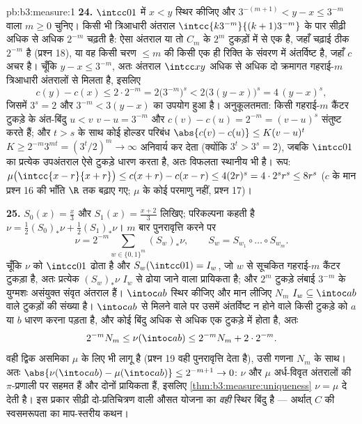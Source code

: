 \begin{solution}{pb:b3:measure:1}
\textbf{24.} $\intcc01$ में $x < y$ स्थिर कीजिए और $3^{-(m+1)} < y - x \leq 3^{-m}$ वाला $m \geq 0$ चुनिए।
किसी भी त्रिआधारी अंतराल $\intcc{k3^{-m}}{(k+1)3^{-m}}$ के पार सीढ़ी अधिक से अधिक $2^{-m}$
चढ़ती है: ऐसा अंतराल या तो $C_m$ के $2^m$ टुकड़ों में से एक है, जहाँ
चढ़ाई ठीक $2^{-m}$ है (प्रश्न 18), या वह किसी चरण $\leq m$ की किसी एक ही
रिक्ति के संवरण में अंतर्विष्ट है, जहाँ $c$ अचर है। चूँकि $y - x \leq
3^{-m}$,
अतः अंतराल $\intcc xy$ अधिक से अधिक दो क्रमागत गहराई-$m$ त्रिआधारी
अंतरालों से मिलता है, इसलिए
\[
c(y) - c(x) \leq 2\cdot2^{-m}
= 2\bigl(3^{-m}\bigr)^{s}
< 2\bigl(3(y - x)\bigr)^{s}
= 4\,(y - x)^{s},
\]
जिसमें $3^{s} = 2$ और $3^{-m} < 3(y - x)$ का उपयोग हुआ है। अनुकूलतमता: किसी गहराई-$m$
कैंटर टुकड़े के अंत-बिंदु $u < v$ $v - u =
3^{-m}$ और $c(v) - c(u) = 2^{-m} = (v - u)^{s}$ संतुष्ट करते हैं; और
$t > s$ के साथ कोई होल्डर परिबंध $\abs{c(v) - c(u)} \leq K(v - u)^{t}$ $K \geq 2^{-m}3^{mt} = (3^{t}/2)^{m} \to \infty$ अनिवार्य कर देता (क्योंकि
$3^{t} > 3^{s} = 2$), जबकि $\intcc01$ का प्रत्येक उपअंतराल ऐसे टुकड़े धारण करता है, अतः
विफलता स्थानीय भी है।  रूप: $\mu\bigl(\intcc{x-r}{x+r}\bigr) \leq
c(x + r) - c(x - r) \leq 4(2r)^{s} = 4\cdot2^{s}r^{s} \leq
8r^{s}$ ($c$ के मान प्रश्न 16 की
भाँति $\R$ तक बढ़ाए गए; $\mu$ के कोई परमाणु नहीं, प्रश्न 17)।

\textbf{25.} $S_0(x) = \frac x3$ और $S_1(x) =
\frac{x+2}3$ लिखिए; परिकल्पना कहती है $\nu = \frac12(S_0)_*\nu +
\frac12(S_1)_*\nu$। $m$
बार पुनरावृत्ति करने पर
\[
\nu = 2^{-m}\sum_{w \in \{0,1\}^m}(S_w)_*\nu,
\qquad S_w = S_{w_1}\circ\dots\circ S_{w_m}.
\]
चूँकि $\nu$ को $\intcc01$ ढोता है और $S_w(\intcc01) =
I_w$, जो $w$ से सूचकित गहराई-$m$
कैंटर टुकड़ा है, अतः प्रत्येक $(S_w)_*\nu$ $I_w$ से ढोया जाने वाला प्रायिकता
 है; और $2^m$ टुकड़े लंबाई $3^{-m}$ के युग्मशः असंयुक्त संवृत अंतराल
हैं। $\intoc ab$ स्थिर कीजिए और मान लीजिए $N_m$ $I_w \subseteq \intoc ab$ वाले टुकड़ों की संख्या
है। $\intoc ab$ से मिलने वाले पर उसमें अंतर्विष्ट न होने वाले किसी टुकड़े
को $a$ या $b$ धारण करना पड़ता है, और कोई बिंदु अधिक से अधिक एक
टुकड़े में होता है, अतः
\[
2^{-m}N_m \leq \nu(\intoc ab) \leq 2^{-m}N_m + 2\cdot2^{-m}.
\]
वही द्विक असमिका $\mu$ के लिए भी लागू है (प्रश्न 19 वही पुनरावृत्ति
देता है), उसी गणना $N_m$ के साथ। अतः $\abs{\nu(\intoc ab) - \mu(\intoc ab)} \leq 2^{-m+1} \to 0$: $\nu$ और $\mu$ अर्ध-विवृत
अंतरालों की $\pi$-प्रणाली पर सहमत हैं और दोनों प्रायिकता  हैं,
इसलिए \cref{thm:b3:measure:uniqueness} $\nu = \mu$ दे देती है। इस प्रकार सीढ़ी  दो-प्रतिचित्रण
वाली औसत योजना का \emph{वही} स्थिर बिंदु है --- अर्थात् $C$ की
स्वसमरूपता का माप-स्तरीय कथन।
\end{solution}
